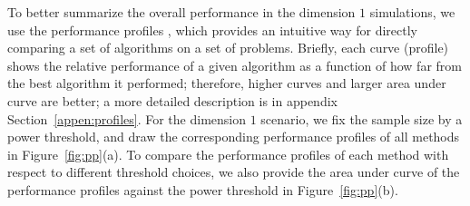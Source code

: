 \documentclass[11pt]{article}
\begin{document}
To better summarize the overall performance in the dimension $1$ simulations, we use the performance profiles \cite{DolanMore2002}, which provides an intuitive way for directly comparing a set of algorithms on a set of problems.  Briefly, each curve (profile) shows the relative performance of a given algorithm as a function of how far from the best algorithm it performed; therefore, higher curves and larger area under curve are better; a more detailed description is in appendix Section~\ref{appen:profiles}. For the dimension $1$ scenario, we fix the sample size by a power threshold, and draw the corresponding performance profiles of all methods in Figure~\ref{fig:pp}(a). To compare the performance profiles of each method with respect to different threshold choices, we also provide the area under curve of the performance profiles against the power threshold in Figure~\ref{fig:pp}(b).
\end{document}
